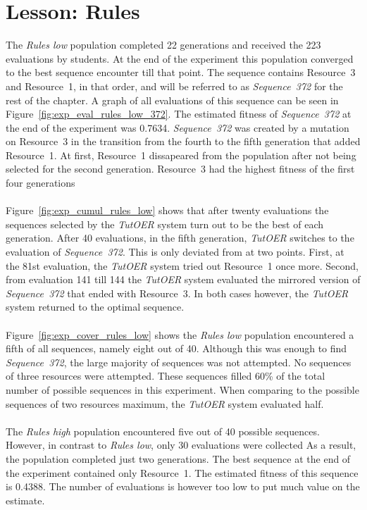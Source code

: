 \section{Lesson: Rules}
\label{sec:results_rules}
The \emph{Rules low} population completed 22 generations and received the
223 evaluations by students. At the end of the experiment
this population converged to the best sequence encounter till that point. The
sequence contains Resource~3 and Resource~1, in that order, and will be
referred to as \emph{Sequence~372} for the rest of the chapter. A graph of all
evaluations of this sequence can be seen in
Figure~\ref{fig:exp_eval_rules_low_372}.
The estimated fitness of \emph{Sequence~372} at the end of the experiment was
0.7634. \emph{Sequence~372} was created by a mutation on Resource~3 in the transition
from the fourth to the fifth generation that added Resource~1. At first,
Resource~1 dissapeared from the population after not being selected for the
second generation. Resource~3 had the highest fitness of the first four
generations \\\\
\noindent
Figure~\ref{fig:exp_cumul_rules_low} shows that after twenty evaluations the
sequences selected by the \emph{TutOER} system turn out to be the best of each
generation. After 40 evaluations, in the fifth generation, \emph{TutOER}
switches to the evaluation of \emph{Sequence~372}. This is only deviated from at
two points. First, at the 81st evaluation, the \emph{TutOER} system tried out
Resource~1 once more. Second, from evaluation 141 till 144 the \emph{TutOER}
system evaluated the mirrored version of \emph{Sequence~372} that ended with
Resource~3. In both cases however, the \emph{TutOER} system returned to the
optimal sequence.\\\\
\noindent
Figure~\ref{fig:exp_cover_rules_low} shows the \emph{Rules low} population
encountered a fifth of all sequences, namely eight out of 40. Although this was
enough to find \emph{Sequence~372}, the large majority of sequences was not
attempted. No sequences of three resources were attempted. These sequences
filled 60\% of the total number of possible sequences in this experiment. When
comparing to the possible sequences of two resources maximum, the \emph{TutOER}
system evaluated half.\\\\
\noindent
The \emph{Rules high} population encountered five out of 40 possible sequences.
However, in contrast to \emph{Rules low}, only 30 evaluations were collected
As a result, the population completed just two generations. The best sequence at the
end of the experiment contained only Resource~1. The estimated fitness of this
sequence is 0.4388. The number of evaluations is however too low to put much
value on the estimate.\\\\
\noindent

